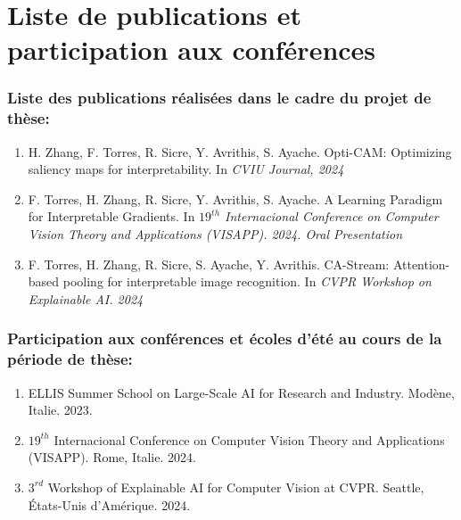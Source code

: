 \newpage
\chapter*{Liste de publications et participation aux conférences}
\subsection*{Liste des publications réalisées dans le cadre du projet de thèse:}
\begin{enumerate}
    \item H. Zhang, F. Torres, R. Sicre, Y. Avrithis, S. Ayache. Opti-CAM: 
    Optimizing saliency maps for interpretability. In \emph{CVIU Journal, 2024}
    \item F. Torres, H. Zhang, R. Sicre, Y. Avrithis, S. Ayache. A Learning Paradigm for 
    Interpretable Gradients. In \emph{$19^{th}$ Internacional Conference on Computer Vision 
    Theory and Applications (VISAPP). 2024. Oral Presentation}
    \item F. Torres, H. Zhang, R. Sicre, S. Ayache, Y. Avrithis. CA-Stream: 
    Attention-based pooling for interpretable image recognition. In \emph{CVPR Workshop 
    on Explainable AI. 2024}
\end{enumerate}


\subsection*{Participation aux conférences et écoles d’été au cours de la période de thèse:}
\begin{enumerate}
\item ELLIS Summer School on Large-Scale AI for Research and Industry. Modène, Italie. 2023.
\item $19^{th}$ Internacional Conference on Computer Vision Theory and Applications (VISAPP). Rome, Italie. 2024.
\item $3^{rd}$ Workshop of Explainable AI for Computer Vision at CVPR. Seattle, États-Unis d'Amérique. 2024.
\end{enumerate}

